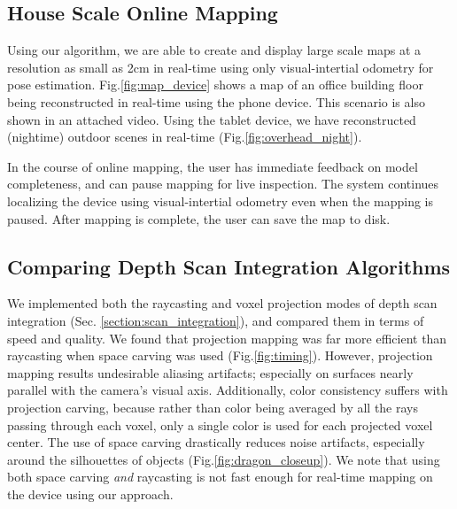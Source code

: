 \documentclass[10pt,twocolumn,letterpaper]{article}
\newcommand{\figref}[1]{Fig.\ref{#1}}
\begin{document}
%  
%  
\subsection{House Scale Online Mapping}
\label{section:mapping}
Using our algorithm, we are able to create and display large scale maps at a
resolution as small as 2cm in real-time using only visual-intertial odometry for
pose estimation. \figref{fig:map_device} shows a map of an office building floor
being reconstructed in real-time using the phone device. This scenario is also
shown in an attached video. Using the tablet device, we have reconstructed
(nightime) outdoor scenes in real-time (\figref{fig:overhead_night}).

In the course of online mapping, the user has immediate feedback on model
completeness, and can pause mapping for live inspection. The system continues
localizing the device using visual-intertial odometry even when the mapping is
paused. After mapping is complete, the user can save the map to disk.
 
\subsection{Comparing Depth Scan Integration Algorithms} 
\label{section:scan_compare}
We implemented both the raycasting and voxel projection modes of depth scan
integration (Sec. \ref{section:scan_integration}), and compared them in terms of
speed and quality. We found that projection mapping was far more efficient than
raycasting when space carving was used (\figref{fig:timing}). However,
projection mapping results undesirable aliasing artifacts; especially on
surfaces nearly parallel with the camera's visual axis. Additionally, color consistency suffers
with projection carving, because rather than color being averaged by all the
rays passing through each voxel, only a single color is used for each projected
voxel center. The use of space carving drastically reduces noise artifacts,
especially around the silhouettes of objects (\figref{fig:dragon_closeup}). We
note that using both space carving \emph{and} raycasting is not fast enough for real-time mapping on the device
using our approach.
\end{document}
